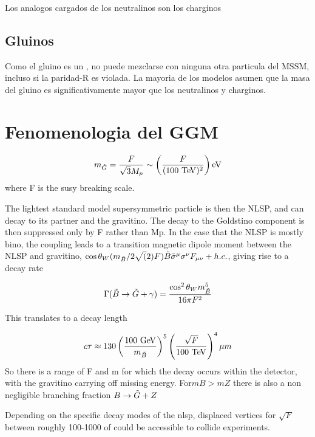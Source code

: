Los analogos cargados de los neutralinos son los charginos

\subsection{Gluinos}

Como el gluino es un , no puede mezclarse con ninguna
otra particula del MSSM, incluso si la paridad-R es violada. La mayoria de los
modelos asumen que la masa del gluino es significativamente mayor  que los
neutralinos y charginos.





\section{Fenomenologia del GGM}


\begin{equation*}
  m_{\gravino} = \frac{F}{\sqrt{3} M_p} \sim \left( \frac{F}{(100 \tev)^2} \right) \mathrm{eV}
\end{equation*}
where F is the susy breaking scale.

The lightest standard model supersymmetric
particle is then the NLSP, and can decay to its partner and the
gravitino.
The decay to the Goldstino component is then suppressed
only by F rather than Mp. In the case that the NLSP is mostly bino, the
coupling leads to a transition magnetic dipole moment between the NLSP
and gravitino, $\cos\theta_W (m_{\tilde{B}}/2\sqrt(2) F) \tilde{B} \bar{\sigma}^\mu \sigma^\nu F_{\mu\nu} + h.c.$,
giving rise to a decay rate

\begin{equation*}
  \Gamma(\bino\to \gravino + \gamma) = \frac{\cos^2\theta_W m_{\bino}^5}{16\pi F^2}
\end{equation*}

This translates to a decay length

\begin{equation}
  c\tau \approx 130 \left( \frac{100 \gev}{m_{\bino}} \right)^5 \left( \frac{\sqrt{F}}{100 \tev} \right)^4 \mu m
\end{equation}
So there is a range of F and m for which the decay occurs within the detector, with the gravitino carrying off missing energy. For$ mB > mZ$ there is
also a non negligible branching fraction $B\rightarrow\tilde{G} + Z$

Depending on the specific decay modes of the nlsp, displaced vertices for $\sqrt{F}$ between roughly 100-1000 of \tev could be accessible to collide experiments.

